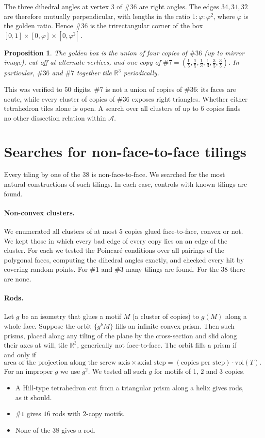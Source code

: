 \documentclass[11pt]{amsart}
\newtheorem{proposition}[theorem]{Proposition}
\theoremstyle{definition}
\newcommand{\cA}{\mathscr{A}}
\newcommand{\R}{\mathbb{R}}
\begin{document}
The three dihedral angles at vertex $3$ of $\#36$ are right angles. The edges $34,31,32$ are therefore mutually
perpendicular, with lengths in the ratio $1:\varphi:\varphi^2$, where $\varphi$ is the golden ratio. Hence $\#36$ is the
trirectangular corner of the box $[0,1]\times[0,\varphi]\times[0,\varphi^2]$.

\begin{proposition}
The golden box is the union of four copies of $\#36$ (up to mirror image), cut off at alternate vertices, and one copy of
$\#7=(\frac15,\frac15,\frac13,\frac13,\frac35,\frac35)$. In particular, $\#36$ and $\#7$ together tile $\R^3$
periodically.
\end{proposition}
This was verified to $50$ digits. $\#7$ is not a union of copies of $\#36$: its faces are acute, while every cluster of
copies of $\#36$ exposes right triangles. Whether either tetrahedron tiles alone is open. A search over all clusters of
up to $6$ copies finds no other dissection relation within $\cA$.

\section{Searches for non-face-to-face tilings}\label{sec:search}
Every tiling by one of the $38$ is non-face-to-face. We searched for the most natural constructions of such tilings. In
each case, controls with known tilings are found.

\paragraph{Non-convex clusters.} We enumerated all clusters of at most $5$ copies glued face-to-face, convex or not. We
kept those in which every bad edge of every copy lies on an edge of the cluster. For each we tested the Poincar\'e
conditions over all pairings of the polygonal faces, computing the dihedral angles exactly, and checked every hit by
covering random points. For $\#1$ and $\#3$ many tilings are found. For the $38$ there are none.

\paragraph{Rods.} Let $g$ be an isometry that glues a motif $M$ (a cluster of copies) to $g(M)$ along a whole face.
Suppose the orbit $\{g^k M\}$ fills an infinite convex prism. Then such prisms, placed along any tiling of the plane by
the cross-section and slid along their axes at will, tile $\R^3$, generically not face-to-face. The orbit fills a prism
if and only if
\[\text{area of the projection along the screw axis}\times\text{axial step}=(\text{copies per step})\cdot\mathrm{vol}(T).\]
For an improper $g$ we use $g^2$. We tested all such $g$ for motifs of $1$, $2$ and $3$ copies.
\begin{itemize}[leftmargin=1.5em]
\item A Hill-type tetrahedron cut from a triangular prism along a helix gives rods, as it should.
\item $\#1$ gives $16$ rods with $2$-copy motifs.
\item None of the $38$ gives a rod.
\end{itemize}
\end{document}
